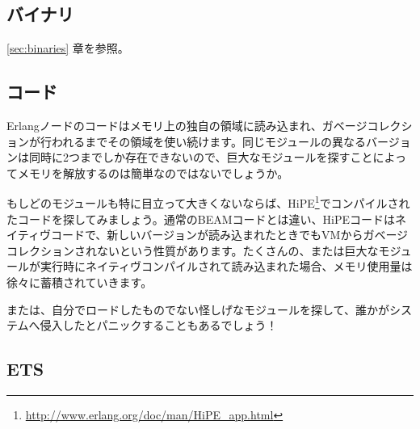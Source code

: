 \subsection{バイナリ}

\ref{sec:binaries} 章を参照。

\subsection{コード}

Erlangノードのコードはメモリ上の独自の領域に読み込まれ、ガベージコレクションが行われるまでその領域を使い続けます。同じモジュールの異なるバージョンは同時に2つまでしか存在できないので、巨大なモジュールを探すことによってメモリを解放するのは簡単なのではないでしょうか。

もしどのモジュールも特に目立って大きくないならば、HiPE\footnote{\href{http://www.erlang.org/doc/man/HiPE\_app.html}{http://www.erlang.org/doc/man/HiPE\_app.html}}でコンパイルされたコードを探してみましょう。通常のBEAMコードとは違い、HiPEコードはネイティヴコードで、新しいバージョンが読み込まれたときでもVMからガベージコレクションされないという性質があります。たくさんの、または巨大なモジュールが実行時にネイティヴコンパイルされて読み込まれた場合、メモリ使用量は徐々に蓄積されていきます。

または、自分でロードしたものでない怪しげなモジュールを探して、誰かがシステムへ侵入したとパニックすることもあるでしょう！

\subsection{ETS}

